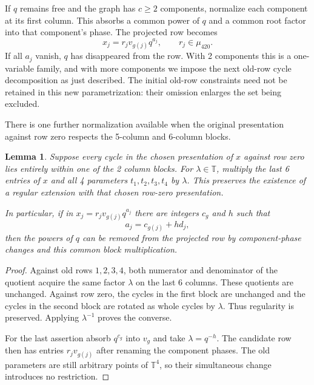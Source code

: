 \documentclass[11pt,a4paper]{article}
\newtheorem{lemma}[theorem]{Lemma}
\theoremstyle{plain}
\theoremstyle{definition}
\theoremstyle{plain}
\begin{document}
If $q$ remains free and the graph has $c\geq2$ components, normalize each component at its first column. This absorbs a common power of $q$ and a common root factor into that component's phase. The projected row becomes
\[
x_j=r_jv_{g(j)}q^{a_j},\qquad r_j\in\mu_{420}.
\]
If all $a_j$ vanish, $q$ has disappeared from the row. With 2 components this is a one-variable family, and with more components we impose the next old-row cycle decomposition as just described. The initial old-row constraints need not be retained in this new parametrization: their omission enlarges the set being excluded.

There is one further normalization available when the original presentation against row zero respects the 5-column and 6-column blocks.

\par\addvspace{\medskipamount}\noindent
\begin{minipage}{\linewidth}
\begin{lemma}\label{n11_full:gauge}
Suppose every cycle in the chosen presentation of $x$ against row zero lies entirely within one of the 2 column blocks. For $\lambda\in\mathbb T$, multiply the last 6 entries of $x$ and all 4 parameters $t_1,t_2,t_3,t_4$ by $\lambda$. This preserves the existence of a regular extension with that chosen row-zero presentation.

In particular, if in $x_j=r_jv_{g(j)}q^{a_j}$ there are integers $c_g$ and $h$ such that
$$a_j=c_{g(j)}+hd_j,$$
then the powers of $q$ can be removed from the projected row by component-phase changes and this common block multiplication.
\end{lemma}
\end{minipage}
\par\addvspace{\medskipamount}

\begin{proof}
Against old rows $1,2,3,4$, both numerator and denominator of the quotient acquire the same factor $\lambda$ on the last 6 columns. These quotients are unchanged. Against row zero, the cycles in the first block are unchanged and the cycles in the second block are rotated as whole cycles by $\lambda$. Thus regularity is preserved. Applying $\lambda^{-1}$ proves the converse.

For the last assertion absorb $q^{c_g}$ into $v_g$ and take $\lambda=q^{-h}$. The candidate row then has entries $r_jv_{g(j)}$ after renaming the component phases. The old parameters are still arbitrary points of $\mathbb T^4$, so their simultaneous change introduces no restriction.
\end{proof}
\end{document}
